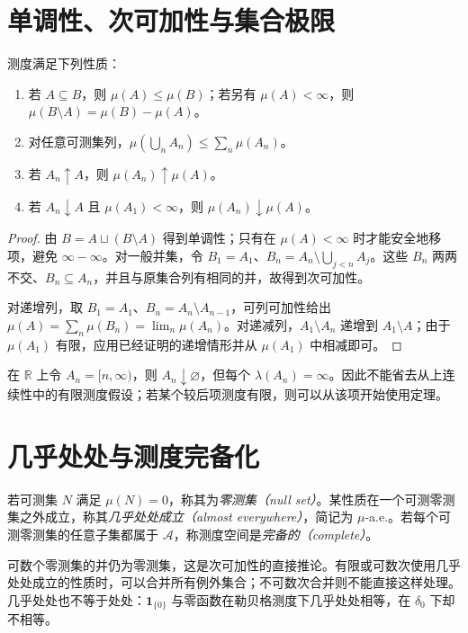 \section{单调性、次可加性与集合极限}
\begin{proposition}
测度满足下列性质：
\begin{enumerate}
 \item 若 $A\subseteq B$，则 $\mu(A)\leq\mu(B)$；若另有 $\mu(A)<\infty$，则 $\mu(B\setminus A)=\mu(B)-\mu(A)$。
 \item 对任意可测集列，$\mu(\bigcup_nA_n)\leq\sum_n\mu(A_n)$。
 \item 若 $A_n\uparrow A$，则 $\mu(A_n)\uparrow\mu(A)$。
 \item 若 $A_n\downarrow A$ 且 $\mu(A_1)<\infty$，则 $\mu(A_n)\downarrow\mu(A)$。
\end{enumerate}
\label{prop:mt-measure-continuity}
\end{proposition}
\begin{proof}
由 $B=A\sqcup(B\setminus A)$ 得到单调性；只有在 $\mu(A)<\infty$ 时才能安全地移项，避免 $\infty-\infty$。对一般并集，令 $B_1=A_1$、$B_n=A_n\setminus\bigcup_{j<n}A_j$。这些 $B_n$ 两两不交、$B_n\subseteq A_n$，并且与原集合列有相同的并，故得到次可加性。

对递增列，取 $B_1=A_1$、$B_n=A_n\setminus A_{n-1}$，可列可加性给出 $\mu(A)=\sum_n\mu(B_n)=\lim_n\mu(A_n)$。对递减列，$A_1\setminus A_n$ 递增到 $A_1\setminus A$；由于 $\mu(A_1)$ 有限，应用已经证明的递增情形并从 $\mu(A_1)$ 中相减即可。
\end{proof}

\begin{example}[从上连续性需要有限性条件]
在 $\mathbb R$ 上令 $A_n=[n,\infty)$，则 $A_n\downarrow\varnothing$，但每个 $\lambda(A_n)=\infty$。因此不能省去从上连续性中的有限测度假设；若某个较后项测度有限，则可以从该项开始使用定理。
\end{example}

\section{几乎处处与测度完备化}
\begin{definition}
若可测集 $N$ 满足 $\mu(N)=0$，称其为\emph{零测集（null set）}。某性质在一个可测零测集之外成立，称其\emph{几乎处处成立（almost everywhere）}，简记为 $\mu$-a.e.。若每个可测零测集的任意子集都属于 $\mathcal A$，称测度空间是\emph{完备的（complete）}。
\end{definition}

可数个零测集的并仍为零测集，这是次可加性的直接推论。有限或可数次使用几乎处处成立的性质时，可以合并所有例外集合；不可数次合并则不能直接这样处理。几乎处处也不等于处处：$\mathbf1_{\{0\}}$ 与零函数在勒贝格测度下几乎处处相等，在 $\delta_0$ 下却不相等。

